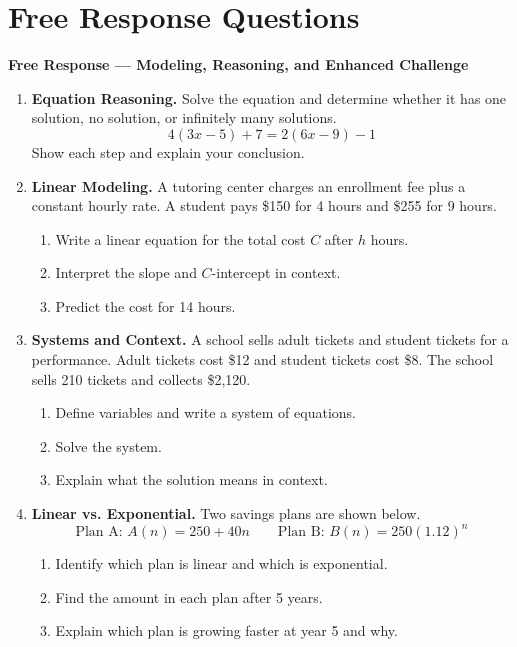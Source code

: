 \documentclass[11pt]{article}
\newcommand{\longwork}{\vspace{4.2cm}}
\begin{document}
\section*{Free Response Questions}
\begin{partBox}
{\large \textcolor{nppurple2}{\textbf{Free Response --- Modeling, Reasoning, and Enhanced Challenge}}}
\end{partBox}
\begin{enumerate}
\item \textbf{Equation Reasoning.} Solve the equation and determine whether it has one solution, no solution, or infinitely many solutions.
\[
4(3x-5)+7=2(6x-9)-1
\]
Show each step and explain your conclusion.
\longwork

\item \textbf{Linear Modeling.} A tutoring center charges an enrollment fee plus a constant hourly rate. A student pays \$150 for 4 hours and \$255 for 9 hours.
\begin{enumerate}[label=(\alph*)]
\item Write a linear equation for the total cost $C$ after $h$ hours.
\item Interpret the slope and $C$-intercept in context.
\item Predict the cost for 14 hours.
\end{enumerate}
\longwork

\newpage
\item \textbf{Systems and Context.} A school sells adult tickets and student tickets for a performance. Adult tickets cost \$12 and student tickets cost \$8. The school sells 210 tickets and collects \$2,120.
\begin{enumerate}[label=(\alph*)]
\item Define variables and write a system of equations.
\item Solve the system.
\item Explain what the solution means in context.
\end{enumerate}
\longwork

\item \textbf{Linear vs. Exponential.} Two savings plans are shown below.
\[
\text{Plan A: } A(n)=250+40n \qquad \text{Plan B: } B(n)=250(1.12)^n
\]
\begin{enumerate}[label=(\alph*)]
\item Identify which plan is linear and which is exponential.
\item Find the amount in each plan after 5 years.
\item Explain which plan is growing faster at year 5 and why.
\end{enumerate}
\longwork


\end{enumerate}
\end{document}
